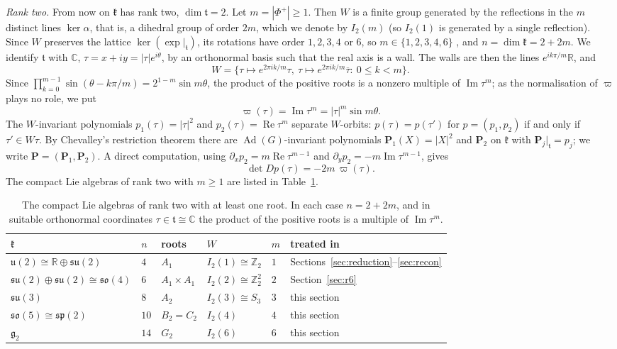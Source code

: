 \documentclass[11pt]{amsart}
\theoremstyle{definition}
\theoremstyle{remark}
\numberwithin{equation}{section}
\newcommand{\R}{\mathbb{R}}
\newcommand{\C}{\mathbb{C}}
\newcommand{\Z}{\mathbb{Z}}
\DeclareMathOperator{\re}{Re}
\DeclareMathOperator{\im}{Im}
\newcommand{\Ad}{\operatorname{Ad}}
\newcommand{\kf}{\mathfrak{k}}
\newcommand{\tf}{\mathfrak{t}}
\begin{document}
\emph{Rank two.} From now on $\kf$ has rank two, $\dim\tf=2$. Let $m=|\Phi^+|\geq1$. Then $W$ is a finite group generated by the reflections in the $m$ distinct lines $\ker\alpha$, that is, a dihedral group of order $2m$, which we denote by $I_2(m)$ (so $I_2(1)$ is generated by a single reflection). Since $W$ preserves the lattice $\ker(\exp|_\tf)$, its rotations have order $1,2,3,4$ or $6$, so $m\in\{1,2,3,4,6\}$ \cite{Hum90}, and $n=\dim\kf=2+2m$. We identify $\tf$ with $\C$, $\tau=x+iy=|\tau|e^{i\theta}$, by an orthonormal basis such that the real axis is a wall. The walls are then the lines $e^{ik\pi/m}\R$, and
\[
W=\{\tau\mapsto e^{2\pi ik/m}\tau,\ \tau\mapsto e^{2\pi ik/m}\overline\tau:\ 0\leq k<m\}.
\]
Since $\prod_{k=0}^{m-1}\sin(\theta-k\pi/m)=2^{1-m}\sin m\theta$, the product of the positive roots is a nonzero multiple of $\im\tau^m$; as the normalisation of $\varpi$ plays no role, we put
\[
\varpi(\tau)=\im\tau^m=|\tau|^m\sin m\theta .
\]
The $W$-invariant polynomials $p_1(\tau)=|\tau|^2$ and $p_2(\tau)=\re\tau^m$ separate $W$-orbits: $p(\tau)=p(\tau')$ for $p=(p_1,p_2)$ if and only if $\tau'\in W\tau$. By Chevalley's restriction theorem \cite[Ch.~II]{Hel84} there are $\Ad(G)$-invariant polynomials $\mathbf P_1(X)=|X|^2$ and $\mathbf P_2$ on $\kf$ with $\mathbf P_j|_\tf=p_j$; we write $\mathbf P=(\mathbf P_1,\mathbf P_2)$. A direct computation, using $\partial_xp_2=m\re\tau^{m-1}$ and $\partial_yp_2=-m\im\tau^{m-1}$, gives
\begin{equation}\label{lie:eq:jac}
\det Dp(\tau)=-2m\,\varpi(\tau).
\end{equation}
The compact Lie algebras of rank two with $m\geq1$ are listed in Table~\ref{lie:tab:rank2}.

\begin{table}[ht]
\centering
\small
\begin{tabular}{@{}llllll@{}}
\toprule
$\kf$ & $n$ & roots & $W$ & $m$ & treated in\\
\midrule
$\mathfrak u(2)\cong\R\oplus\mathfrak{su}(2)$ & $4$ & $A_1$ & $I_2(1)\cong\Z_2$ & $1$ & Sections~\ref{sec:reduction}--\ref{sec:recon}\\
$\mathfrak{su}(2)\oplus\mathfrak{su}(2)\cong\mathfrak{so}(4)$ & $6$ & $A_1\times A_1$ & $I_2(2)\cong\Z_2^2$ & $2$ & Section~\ref{sec:r6}\\
$\mathfrak{su}(3)$ & $8$ & $A_2$ & $I_2(3)\cong S_3$ & $3$ & this section\\
$\mathfrak{so}(5)\cong\mathfrak{sp}(2)$ & $10$ & $B_2=C_2$ & $I_2(4)$ & $4$ & this section\\
$\mathfrak g_2$ & $14$ & $G_2$ & $I_2(6)$ & $6$ & this section\\
\bottomrule
\end{tabular}
\caption{The compact Lie algebras of rank two with at least one root. In each case $n=2+2m$, and in suitable orthonormal coordinates $\tau\in\tf\cong\C$ the product of the positive roots is a multiple of $\im\tau^m$.}
\label{lie:tab:rank2}
\end{table}
\end{document}

